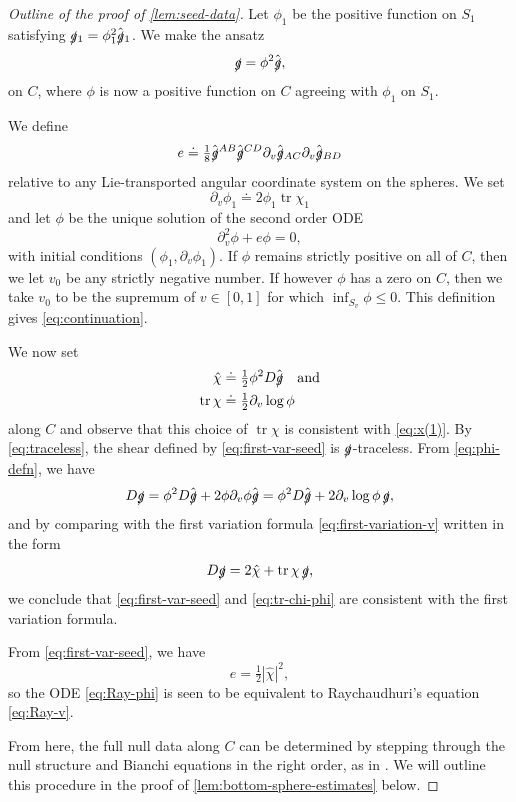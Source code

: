 \documentclass[10pt]{article}
\numberwithin{equation}{section}
\theoremstyle{plain}
\theoremstyle{definition}
\newcommand{\tr}{\operatorname{tr}}
\begin{document}
\begin{proof}[Outline of the proof of \cref{lem:seed-data}]
    Let $\phi_1$ be the positive function on $S_1$ satisfying $\slashed g{}_1=\phi^2_1\hat{\slashed g}{}_1$. We make the ansatz
    \begin{equation}
    \slashed g = \phi^2 \hat{\slashed g}, \label{eq:phi-defn}
\end{equation} on $C$, where $\phi$ is now a positive function on $C$ agreeing with $\phi_1$ on $S_1$. 
    
 We define
\begin{equation}
    e \doteq \tfrac 18 \hat{\slashed g}{}^{AB} \hat{\slashed g}{}^{CD} \partial_v \hat{\slashed g}{}_{AC}\partial_v\hat{\slashed g}{}_{BD}\label{eq:e-calc}
\end{equation}
     relative to any Lie-transported angular coordinate system on the spheres. We set
\begin{equation}
    \partial_v\phi_1\doteq 2\phi_1\tr\chi_1
\end{equation}
and let $\phi$ be the unique solution of the second order ODE 
\begin{equation}
    \partial_v^2\phi + e\phi =0, \label{eq:Ray-phi}
\end{equation}
with initial conditions $(\phi_1,\partial_v\phi_1)$. If $\phi$ remains strictly positive on all of $C$, then we let $v_0$ be any strictly negative number. If however $\phi$ has a zero on $C$, then we take $v_0$ to be the supremum of $v\in [0,1]$ for which $\inf_{S_v}\phi \le 0$. This definition gives \eqref{eq:continuation}.

We now set
\begin{align}
    \hat\chi &\doteq \tfrac 12 \phi^2 D\hat{\slashed g}\label{eq:first-var-seed}\quad\text{and}\\
       \tr\chi &\doteq \tfrac 12\partial_v \log\phi\label{eq:tr-chi-phi}
\end{align}
along $C$ and observe that this choice of $\tr\chi$ is consistent with \eqref{eq:x(1)}. By \eqref{eq:traceless}, the shear defined by \eqref{eq:first-var-seed} is $\slashed g$-traceless. From \eqref{eq:phi-defn}, we have
\[D\slashed g = \phi^2 D\hat{\slashed g}+2\phi \partial_v\phi \hat{\slashed g}=\phi^2D\hat{\slashed g}+2\partial_v\log\phi\,\slashed g,\]
and by comparing with the first variation formula \eqref{eq:first-variation-v} written in the form
\[D\slashed g = 2\hat\chi + \tr\chi\,\slashed g,\]
we conclude that \eqref{eq:first-var-seed} and \eqref{eq:tr-chi-phi} are consistent with the first variation formula. 

From \eqref{eq:first-var-seed}, we have
\begin{equation}
    e = \tfrac 12|\hat\chi|^2,\label{eq:e-defn}
\end{equation}
so the ODE \eqref{eq:Ray-phi} is seen to be equivalent to  Raychaudhuri's equation \eqref{eq:Ray-v}.

From here, the full null data along $C$ can be determined by stepping through the null structure and Bianchi equations in the right order, as in \cite{Christo09}. We will outline this procedure in the proof of \cref{lem:bottom-sphere-estimates} below.
\end{proof}
\end{document}
